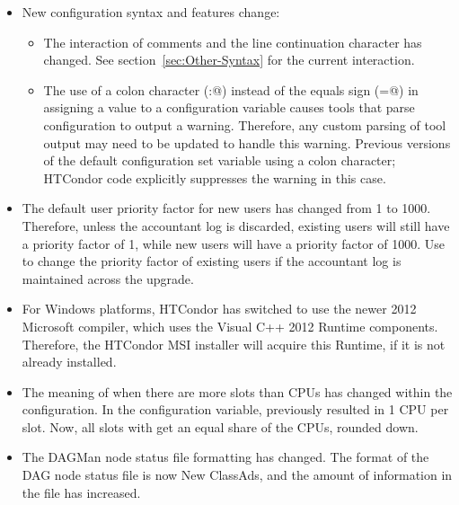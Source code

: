 \begin{itemize}

\item New configuration syntax and features change:
  \begin{itemize}
  \item The interaction of comments and the line continuation character
   has changed.  See  section~\ref{sec:Other-Syntax} for the current
   interaction. 
  \item The use of a colon character (\verb@:@) instead of the
   equals sign (\verb@=@) in assigning a value to a configuration variable
   causes tools that parse configuration to output a warning.
   Therefore, any custom parsing of tool output may need to be updated to
   handle this warning.
   Previous versions of the default configuration set variable
    using a colon character;
   HTCondor code explicitly suppresses the warning in this case.
  \end{itemize}

\item The default user priority factor for new users has changed 
from 1 to 1000.
Therefore, unless the accountant log is discarded,
existing users will still have a priority factor of 1,
while new users will have a priority factor of 1000.
Use  to change the priority factor of existing users
if the accountant log is maintained across the upgrade. 

\item For Windows platforms,
HTCondor has switched to use the newer 2012 Microsoft compiler,
which uses the Visual C++ 2012 Runtime components.
Therefore, the HTCondor MSI installer will acquire this Runtime,
if it is not already installed.

\item The meaning of  when there are more 
slots than CPUs has changed within the configuration. 
In the  configuration variable,
 previously resulted in 1 CPU per slot. 
Now, all slots with  get an equal share of the CPUs, 
rounded down.

\item The DAGMan node status file formatting has changed.
The format of the DAG node status file is now New ClassAds,
and the amount of information in the file has increased.


\end{itemize}
